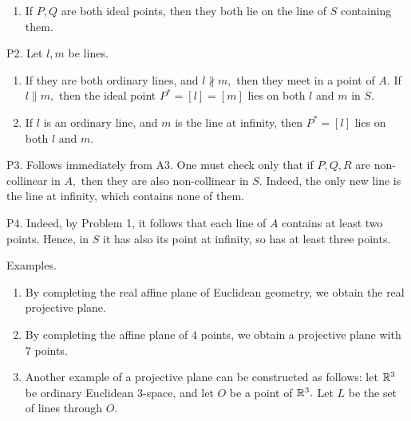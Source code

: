 \begin{isabellebody}
\begin{isamarkuptext}
\begin{enumerate}
\item If $P, Q$ are both ideal points, then they both lie on the line of $S$ containing them.
\end{enumerate}

P2. Let $l, m$ be lines. 
\begin{enumerate}
\item If they are both ordinary lines, and $l \nparallel m,$ then they meet
in a point of $A.$ If $l \parallel m,$ then the ideal point $P^{*} =[l]=[m]$ lies on both $l$ and
$ m$ in $S.$
\item If $l$ is an ordinary line, and $m$ is the line at infinity, then $P^{*} = [l]$ lies on 
both $l$ and $m.$
\end{enumerate}

P3. Follows immediately from A3. One must check only that if $P,Q,R$ are non-collinear in $A,$ then
 they are also non-collinear in $S.$ Indeed, the only new line is the line at infinity, 
which contains none of them.

P4. Indeed, by Problem 1, it follows that each line of $A$ contains at least two points. 
Hence, in $S$ it has also its point at infinity, so has at least three points. \endproof

Examples. 

\begin{enumerate}
\item By completing the real affine plane of Euclidean geometry, we obtain the real projective plane.
\item By completing the affine plane of $4$ points, we obtain a projective plane with $7$ points.
\item Another example of a projective plane can be constructed as follows: let $\Bbb R^3$ be 
ordinary Euclidean 3-space, and let $O$ be a point of $\Bbb R^3.$ Let $L$ be the set of lines 
through $O.$


\end{enumerate}
\end{isamarkuptext}
\end{isabellebody}
